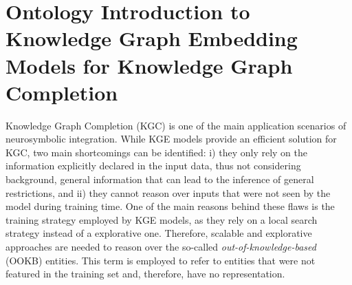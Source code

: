 \section{Ontology Introduction to Knowledge Graph Embedding Models for Knowledge Graph Completion} \label{4_sec:ontointro_kgc}


Knowledge Graph Completion (KGC) is one of the main application scenarios of neurosymbolic integration. While KGE models provide an efficient solution for KGC, two main shortcomings can be identified: i) they only rely on the information explicitly declared in the input data, thus not considering background, general information that can lead to the inference of general restrictions, and ii) they cannot reason over inputs that were not seen by the model during training time. One of the main reasons behind these flaws is the training strategy employed by KGE models, as they rely on a local search strategy instead of a explorative one. Therefore, scalable and explorative approaches are needed to reason over the so-called \textit{out-of-knowledge-based} (OOKB) entities. This term is employed to refer to entities that were not featured in the training set and, therefore, have no representation. 

